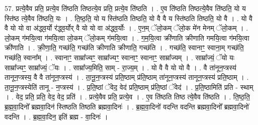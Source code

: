 \documentclass[17pt]{extarticle}
\begin{document}
57. प्रत्ये॒वैव प्रति॒ प्रत्ये॒व ति॑ष्ठति तिष्ठत्ये॒व प्रति॒ प्रत्ये॒व ति॑ष्ठति । . ए॒व ति॑ष्ठति तिष्ठत्ये॒वैव ति॑ष्ठति॒ यो य स्ति॑ष्ठ त्ये॒वैव ति॑ष्ठति॒ यः । . ति॒ष्ठ॒ति॒ यो य स्ति॑ष्ठति तिष्ठति॒ यो वै वै य स्ति॑ष्ठति तिष्ठति॒ यो वै । . यो वै वै यो यो वा अ॑द्ध्व॒र्यो र॑द्ध्व॒र्योर् वै यो यो वा अ॑द्ध्व॒र्योः । . ए॒न॒म् ॅलो॒कम् ॅलो॒क मे॑न मेनम् ॅलो॒कम् । . लो॒कम् ग॑मयि॒त्वा ग॑मयि॒त्वा लो॒कम् ॅलो॒कम् ग॑मयि॒त्वा । . ग॒म॒यि॒त्वा क्री॑णाति क्रीणाति गमयि॒त्वा ग॑मयि॒त्वा क्री॑णाति । . क्री॒णा॒ति॒ गच्छ॑ति॒ गच्छ॑ति क्रीणाति क्रीणाति॒ गच्छ॑ति । . गच्छ॑ति॒ स्वानाꣳ॒॒ स्वाना॒म् गच्छ॑ति॒ गच्छ॑ति॒ स्वाना᳚म् । . स्वानाꣳ॒॒ साम्रा᳚ज्यꣳ॒॒ साम्रा᳚ज्यꣳ॒॒ स्वानाꣳ॒॒ स्वानाꣳ॒॒ साम्रा᳚ज्यम् । . साम्रा᳚ज्यं॒ ॅयो यः साम्रा᳚ज्यꣳ॒॒ साम्रा᳚ज्यं॒ ॅयः । . साम्रा᳚ज्य॒मिति॒ साम् - रा॒ज्य॒म् । . यो वै वै यो यो वै । . वै ता॑नून॒प्त्रस्य॑ तानून॒प्त्रस्य॒ वै वै ता॑नून॒प्त्रस्य॑ । . ता॒नू॒न॒प्त्रस्य॑ प्रति॒ष्ठाम् प्र॑ति॒ष्ठाम् ता॑नून॒प्त्रस्य॑ तानून॒प्त्रस्य॑ प्रति॒ष्ठाम् । . ता॒नू॒न॒प्त्रस्येति॑ तानू - न॒प्त्रस्य॑ । . प्र॒ति॒ष्ठां ॅवेद॒ वेद॑ प्रति॒ष्ठाम् प्र॑ति॒ष्ठां ॅवेद॑ । . प्र॒ति॒ष्ठामिति॑ प्रति - स्थाम् । . वेद॒ प्रति॒ प्रति॒ वेद॒ वेद॒ प्रति॑ । . प्रत्ये॒वैव प्रति॒ प्रत्ये॒व । . ए॒व ति॑ष्ठति तिष्ठ त्ये॒वैव ति॑ष्ठति । . ति॒ष्ठ॒ति॒ ब्र॒ह्म॒वा॒दिनो᳚ ब्रह्मवा॒दिन॑ स्तिष्ठति तिष्ठति ब्रह्मवा॒दिनः॑ । . ब्र॒ह्म॒वा॒दिनो॑ वदन्ति वदन्ति ब्रह्मवा॒दिनो᳚ ब्रह्मवा॒दिनो॑ वदन्ति । . ब्र॒ह्म॒वा॒दिन॒ इति॑ ब्रह्म - वा॒दिनः॑ । \newline
\end{document}
